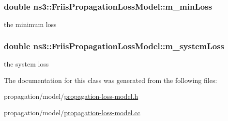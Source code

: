 \subsubsection[{\texorpdfstring{m\+\_\+min\+Loss}{m_minLoss}}]{\setlength{\rightskip}{0pt plus 5cm}double ns3\+::\+Friis\+Propagation\+Loss\+Model\+::m\+\_\+min\+Loss\hspace{0.3cm}{\ttfamily [private]}}\hypertarget{classns3_1_1FriisPropagationLossModel_ae390ab5b83634ed3f5fec7e00fea705d}{}\label{classns3_1_1FriisPropagationLossModel_ae390ab5b83634ed3f5fec7e00fea705d}


the minimum loss 

\subsubsection[{\texorpdfstring{m\+\_\+system\+Loss}{m_systemLoss}}]{\setlength{\rightskip}{0pt plus 5cm}double ns3\+::\+Friis\+Propagation\+Loss\+Model\+::m\+\_\+system\+Loss\hspace{0.3cm}{\ttfamily [private]}}\hypertarget{classns3_1_1FriisPropagationLossModel_ad547e83f7bdb1f4ba7205909886f16f3}{}\label{classns3_1_1FriisPropagationLossModel_ad547e83f7bdb1f4ba7205909886f16f3}


the system loss 



The documentation for this class was generated from the following files\+:\begin{DoxyCompactItemize}
\item 
propagation/model/\hyperlink{propagation-loss-model_8h}{propagation-\/loss-\/model.\+h}\item 
propagation/model/\hyperlink{propagation-loss-model_8cc}{propagation-\/loss-\/model.\+cc}\end{DoxyCompactItemize}
